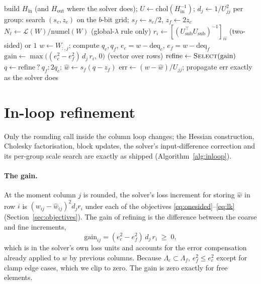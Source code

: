 \documentclass{article}
\newcommand{\gain}{\mathrm{gain}}
\newcommand{\Hin}{H_{\mathrm{in}}}
\newcommand{\Hout}{H_{\mathrm{out}}}
\begin{document}
\begin{algorithm}[t]
\caption{In-loop nested refinement inside a GPTQ-style column loop (one
layer)}
\label{alg:inloop}
\begin{algorithmic}[1]
\STATE build $\Hin$ (and $\Hout$ where the solver does); $U \leftarrow
  \mathrm{chol}(\Hin^{-1})$; $d_j \leftarrow 1/U_{jj}^2$
\STATE per group: search $(s_c, z_c)$ on the $b$-bit grid; $s_f
  \leftarrow s_c/2$, $z_f \leftarrow 2z_c$
\STATE $N_\ell \leftarrow \mathcal{L}(W)/\mathrm{numel}(W)$ (global-$\lambda$
  rule only)
  \STATE $r_i \leftarrow [(U_{\mathrm{sub}}^\top U_{\mathrm{sub}})^{-1}]_{ii}$
    (two-sided) or $1$
    \STATE $w \leftarrow W_{:,j}$; compute $q_c, q_f$, $e_c = w -
      \mathrm{deq}_c$, $e_f = w - \mathrm{deq}_f$
    \STATE $\gain \leftarrow \max\big((e_c^2 - e_f^2)\, d_j\, r_i,\, 0\big)$
      (vector over rows)
    \STATE $\mathrm{refine} \leftarrow \textsc{Select}(\gain)$
    \STATE $q \leftarrow \mathrm{refine}\ ?\ q_f : 2q_c$; $\hat w
      \leftarrow s_f(q - z_f)$
    \STATE $\mathrm{err} \leftarrow (w - \hat w)/U_{jj}$; propagate err
      exactly as the solver does
  \ENDFOR
\ENDFOR
\end{algorithmic}
\end{algorithm}

\section{In-loop refinement}
\label{sec:inloop}

Only the rounding call inside the column loop changes; the Hessian
construction, Cholesky factorisation, block updates, the solver's
input-difference correction and its per-group scale search are exactly
as shipped (Algorithm~\ref{alg:inloop}).

\paragraph{The gain.} At the moment column $j$ is rounded, the solver's
loss increment for storing $\hat w$ in row $i$ is $(w_{ij} - \hat
w_{ij})^2 d_j r_i$ under each of the objectives
\eqref{eq:onesided}--\eqref{eq:lk} (Section~\ref{sec:objectives}). The
gain of refining is the difference between the coarse and fine
increments,
\begin{equation}
  \gain_{ij} = (e_c^2 - e_f^2)\, d_j\, r_i \;\ge\; 0,
  \label{eq:gain}
\end{equation}
which is in the solver's own loss units and accounts for the error
compensation already applied to $w$ by previous columns. Because
$\Lambda_c \subset \Lambda_f$, $e_f^2 \le e_c^2$ except for clamp edge
cases, which we clip to zero. The gain is zero exactly for free elements.
\end{document}
